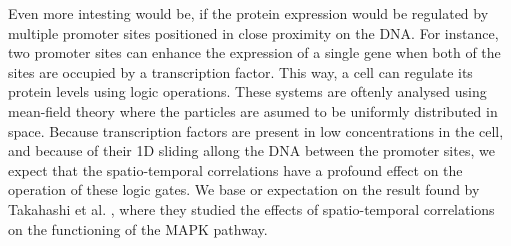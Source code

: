 Even more intesting would be, if the protein expression would be regulated by multiple promoter sites positioned in close proximity on the DNA. For instance, two promoter sites can enhance the expression of a single gene when both of the sites are occupied by a transcription factor. This way, a cell can regulate its protein levels using logic operations. These systems are oftenly analysed using mean-field theory where the particles are asumed to be uniformly distributed in space. Because transcription factors are present in low concentrations in the cell, and because of their 1D sliding allong the DNA between the promoter sites, we expect that the spatio-temporal correlations have a profound effect on the operation of these logic gates. We base or expectation on the result found by Takahashi et al.  \cite{Takahashi2010}, where they studied the effects of spatio-temporal correlations on the functioning of the MAPK pathway.